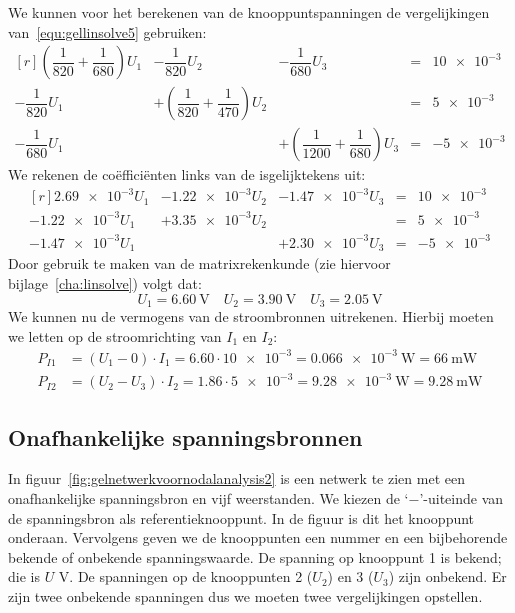 \begin{example}
We kunnen voor het berekenen van de knooppuntspanningen de vergelijkingen van~\eqref{equ:gellinsolve5} gebruiken:
%
\begin{equation}
\begin{matrix*}[r]
\left(\dfrac{1}{820}+\dfrac{1}{680}\right)U_1 & -\dfrac{1}{820}U_2 & -\dfrac{1}{680}U_3 &=& \num{10e-3} \\[1em]
-\dfrac{1}{820}U_1 & +\left(\dfrac{1}{820}+\dfrac{1}{470}\right)U_2 &  & = & \num{5e-3} \\[1em]
-\dfrac{1}{680}U_1 && +\left(\dfrac{1}{1200}+\dfrac{1}{680}\right)U_3 & = &\num{-5e-3}
\end{matrix*}
\end{equation}
%
We rekenen de coëfficiënten links van de isgelijktekens uit:
%
\begin{equation}
\begin{matrix*}[r]
\num{2.69e-3}U_1 & \num{-1.22e-3}U_2 & \num{-1.47e-3}U_3 &=& \num{10e-3} \\[1em]
\num{-1.22e-3}U_1 & +\num{3.35e-3}U_2 &  & = & \num{5e-3} \\[1em]
\num{-1.47e-3}U_1 && +\num{2.30e-3}U_3 & = &\num{-5e-3}
\end{matrix*}
\end{equation}
%
Door gebruik te maken van de matrixrekenkunde (zie hiervoor bijlage~\ref{cha:linsolve}) volgt dat:
%
\begin{equation}
U_1 = \SI{6.60}{\volt} \quad U_2=\SI{3.90}{\volt} \quad U_3 = \SI{2.05}{\volt}
\end{equation}
%
We kunnen nu de vermogens van de stroombronnen uitrekenen. Hierbij moeten we letten op de stroomrichting van $I_1$ en $I_2$:
%
\begin{equation}
\begin{split}
P_{I1} &= (U_1-0)\cdot I_1 = \num{6,60}\cdot\num{10e-3} = \SI{0.066e-3}{\watt} = \SI{66}{\mW} \\
P_{I2} &= (U_2-U_3)\cdot I_2 = \num{1.86}\cdot\num{5e-3} = \SI{9.28e-3}{\watt} = \SI{9.28}{\mW}
\end{split}
\end{equation}
\end{example}

\subsection{Onafhankelijke spanningsbronnen}
In figuur~\ref{fig:gelnetwerkvoornodalanalysis2} is een netwerk te zien met een onafhankelijke spanningsbron en vijf weerstanden. We kiezen de `$-$'-uiteinde van de spanningsbron als referentieknooppunt. In de figuur is dit het knooppunt onderaan. Vervolgens geven we de knooppunten een nummer en een bijbehorende bekende of onbekende spanningswaarde. De spanning op knooppunt 1 is bekend; die is $U$ \si{\volt}. De spanningen op de knooppunten 2 ($U_2$) en 3 ($U_3$) zijn onbekend. Er zijn twee onbekende spanningen dus we moeten twee vergelijkingen opstellen.

